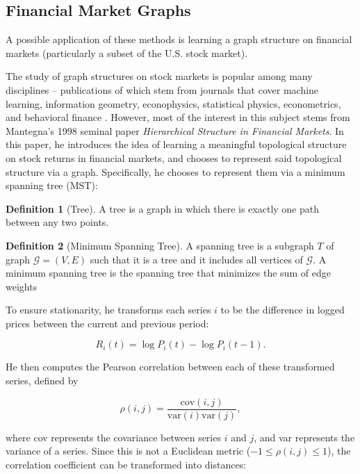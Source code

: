 \documentclass{article}
\theoremstyle{definition}
\newtheorem{definition}{Definition}[section]
\begin{document}
\subsection{Financial Market Graphs}

A possible application of these methods is learning a graph structure on financial markets (particularly a subset of the U.S. stock market). 

The study of graph structures on stock markets is popular among many disciplines -- publications of which stem from journals that cover machine learning, information geometry, econophysics, statistical physics, econometrics, and behavioral finance \cite{networkSurveyFinance}. However, most of the interest in this subject stems from Mantegna's 1998 seminal paper \cite{mantegnaSeminalPaper} \textit{Hierarchical Structure in Financial Markets}. In this paper, he introduces the idea of learning a meaningful topological structure on stock returns in financial markets, and chooses to represent said topological structure via a graph. Specifically, he chooses to represent them via a minimum spanning tree (MST):

\begin{definition}[Tree]
A tree is a graph in which there is exactly one path between any two points.
\end{definition}

\begin{definition}[Minimum Spanning Tree]
A spanning tree is a subgraph $T$ of graph $\mathcal{G} = (V, E)$ such that it is a tree and it includes all vertices of $\mathcal{G}$. A minimum spanning tree is the spanning tree that minimizes the sum of edge weights 
\end{definition}

To ensure stationarity, he transforms each series $i$ to be the difference in logged prices between the current and previous period:

\[
R_i(t) = \log P_i(t) - \log P_i(t-1).
\]

He then computes the Pearson correlation between each of these transformed series, defined by

\[
\rho(i,j) = \frac{\text{cov}(i, j)}{\text{var}(i) \text{var}(j)},
\]

where cov represents the covariance between series $i$ and $j$, and var represents the variance of a series. Since this is not a Euclidean metric ($-1 \leq \rho(i,j) \leq 1$), the correlation coefficient can be transformed into distances:
\end{document}
